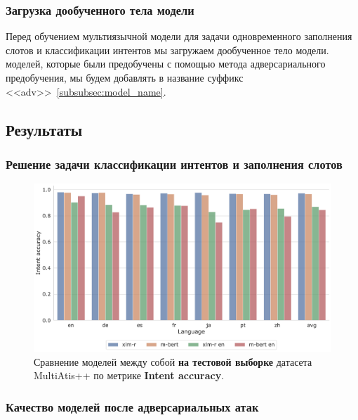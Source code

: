 \subsubsection{Загрузка дообученного тела модели}
Перед обучением мультиязычной модели для задачи одновременного заполнения слотов и классификации интентов мы загружаем дообученное тело модели.
 моделей, которые были предобучены с помощью метода адверсариального предобучения, мы будем добавлять в название суффикс <<adv>>~\eqref{subsubsec:model_name}.

\subsection{Результаты}

\subsubsection{Решение задачи классификации интентов и заполнения слотов}

\begin{figure}[H]
    \centering
    \includegraphics[width=\textwidth]{images/0}
    \caption{Сравнение моделей между собой \textbf{на тестовой выборке} датасета MultiAtis++ по метрике \textbf{Intent accuracy}.}\label{fig:figure0}
\end{figure}


\subsubsection{Качество моделей после адверсариальных атак}

